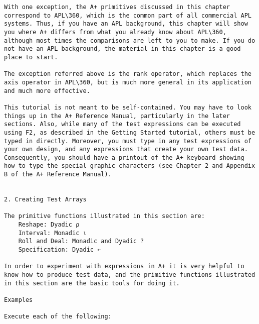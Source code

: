 \documentclass{article}
\begin{document}
\begin{verbatim}
With one exception, the A+ primitives discussed in this chapter       
correspond to APL\360, which is the common part of all commercial APL 
systems. Thus, if you have an APL background, this chapter will show  
you where A+ differs from what you already know about APL\360,        
although most times the comparisons are left to you to make. If you do
not have an APL background, the material in this chapter is a good    
place to start.                                                       

The exception referred above is the rank operator, which replaces the 
axis operator in APL\360, but is much more general in its application 
and much more effective.                                              

This tutorial is not meant to be self-contained. You may have to look 
things up in the A+ Reference Manual, particularly in the later       
sections. Also, while many of the test expressions can be executed    
using F2, as described in the Getting Started tutorial, others must be
typed in directly. Moreover, you must type in any test expressions of 
your own design, and any expressions that create your own test data.  
Consequently, you should have a printout of the A+ keyboard showing   
how to type the special graphic characters (see Chapter 2 and Appendix
B of the A+ Reference Manual).                                        


2. Creating Test Arrays                                               

The primitive functions illustrated in this section are:              
	Reshape: Dyadic ⍴                                                    
	Interval: Monadic ⍳                                                  
	Roll and Deal: Monadic and Dyadic ?                                  
	Specification: Dyadic ←                                              

In order to experiment with expressions in A+ it is very helpful to   
know how to produce test data, and the primitive functions illustrated
in this section are the basic tools for doing it.                     

Examples                                                              

Execute each of the following:                                        


\end{verbatim}
\end{document}
